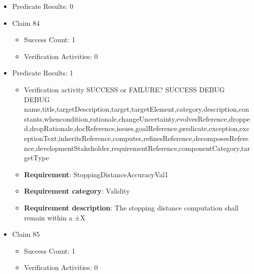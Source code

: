 \documentclass{article}
\begin{document}
\begin{itemize}
\begin{itemize}
				\end{itemize}
				
									    
				\item Predicate Results: 0

  				  \item Claim 84
				\begin{itemize}
			    	\item Success Count: 1 
			    	\item Verification Activities: 0
				\end{itemize}
				
									    
				\item Predicate Results: 1
					\begin{itemize}				
					\item Verification activity SUCCESS or FAILURE? SUCCESS
					DEBUG DEBUG name,title,targetDescription,target,targetElement,category,description,constants,whencondition,rationale,changeUncertainty,evolvesReference,dropped,dropRationale,docReference,issues,goalReference,predicate,exception,exceptionText,inheritsReference,computes,refinesReference,decomposesReference,developmentStakeholder,requirementReference,componentCategory,targetType
					\item \textbf{Requirement}: StoppingDistanceAccuracyVal1 
					\item \textbf{Requirement category}: Validity
					\item \textbf{Requirement description}: The stopping distance computation shall remain within a ±X%
					\end{itemize}

  				  \item Claim 85
				\begin{itemize}
			    	\item Success Count: 1 
			    	\item Verification Activities: 0
				\end{itemize}
				

\end{itemize}
\end{document}
